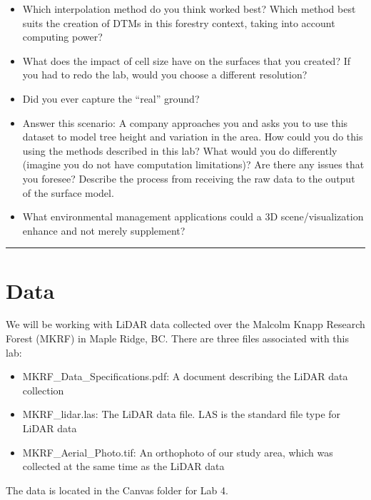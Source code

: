 \documentclass[
]{book}
\providecommand{\tightlist}{%
  \setlength{\itemsep}{0pt}\setlength{\parskip}{0pt}}
\begin{document}
\begin{itemize}
\tightlist
\item
  Which interpolation method do you think worked best? Which method best suits the creation of DTMs in this forestry context, taking into account computing power?
\item
  What does the impact of cell size have on the surfaces that you created? If you had to redo the lab, would you choose a different resolution?
\item
  Did you ever capture the ``real'' ground?
\item
  Answer this scenario: A company approaches you and asks you to use this dataset to model tree height and variation in the area. How could you do this using the methods described in this lab? What would you do differently (imagine you do not have computation limitations)? Are there any issues that you foresee? Describe the process from receiving the raw data to the output of the surface model.
\item
  What environmental management applications could a 3D scene/visualization enhance and not merely supplement?
\end{itemize}

\begin{center}\rule{0.5\linewidth}{0.5pt}\end{center}

\hypertarget{lab4-data}{%
\section*{Data}\label{lab4-data}}

We will be working with LiDAR data collected over the Malcolm Knapp Research Forest (MKRF) in Maple Ridge, BC. There are three files associated with this lab:

\begin{itemize}
\tightlist
\item
  MKRF\_Data\_Specifications.pdf: A document describing the LiDAR data collection
\item
  MKRF\_lidar.las: The LiDAR data file. LAS is the standard file type for LiDAR data
\item
  MKRF\_Aerial\_Photo.tif: An orthophoto of our study area, which was collected at the same time as the LiDAR data
\end{itemize}

The data is located in the Canvas folder for Lab 4.
\end{document}
